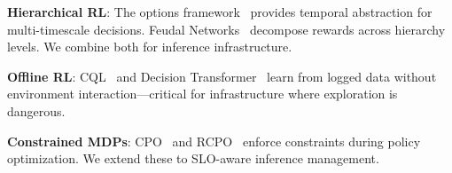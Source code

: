 \documentclass[conference,10pt]{IEEEtran}
\begin{document}
\textbf{Hierarchical RL}: The options framework~\cite{sutton1999options} provides temporal abstraction for multi-timescale decisions. Feudal Networks~\cite{vezhnevets2017feudal} decompose rewards across hierarchy levels. We combine both for inference infrastructure.

\textbf{Offline RL}: CQL~\cite{kumar2020conservative} and Decision Transformer~\cite{chen2021decision} learn from logged data without environment interaction---critical for infrastructure where exploration is dangerous.

\textbf{Constrained MDPs}: CPO~\cite{achiam2017cpo} and RCPO~\cite{tessler2018rcpo} enforce constraints during policy optimization. We extend these to SLO-aware inference management.


\end{document}

